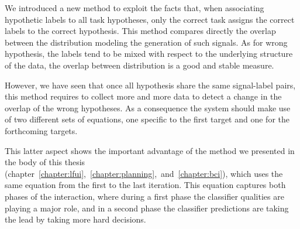 We introduced a new method to exploit the facts that, when associating hypothetic labels to all task hypotheses, only the correct task assigns the correct labels to the correct hypothesis. This method compares directly the overlap between the distribution modeling the generation of such signals. As for wrong hypothesis, the labels tend to be mixed with respect to the underlying structure of the data, the overlap between distribution is a good and stable measure. 

However, we have seen that once all hypothesis share the same signal-label pairs, this method requires to collect more and more data to detect a change in the overlap of the wrong hypotheses. As a consequence the system should make use of two different sets of equations, one specific to the first target and one for the forthcoming targets.

This latter aspect shows the important advantage of the method we presented in the body of this thesis (chapter~\ref{chapter:lfui},~\ref{chapter:planning},~and~\ref{chapter:bci}), which uses the same equation from the first to the last iteration. This equation captures both phases of the interaction, where during a first phase the classifier qualities are playing a major role, and in a second phase the classifier predictions are taking the lead by taking more hard decisions.